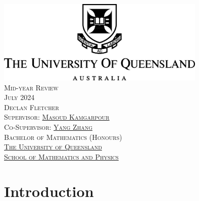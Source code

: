\documentclass[12pt]{amsart}
\theoremstyle{plain}
\begin{document}

\begin{center}
\includegraphics[width=10cm]{../images/UQLogo.jpg} \\ 
\vspace{3cm}
{\LARGE\textsc{Mid-year Review}} \\
{\textsc{July 2024}} \\
\vspace{0.5cm}
{\textsc{Declan Fletcher}} \\
\vspace{5cm}
{\textsc{Supervisor: \href{https://sites.google.com/site/masoudkomi/home}{Masoud Kamgarpour}}} \\
{\textsc{Co-Supervisor: \href{https://sites.google.com/site/yangzhang139/home}{Yang Zhang}}} \\
\vspace{3cm}
{\textsc{Bachelor of Mathematics (Honours)}} \\
\vspace{1cm}
{\textsc{\href{https://www.uq.edu.au/}{The University of Queensland}}} \\
{\textsc{\href{https://smp.uq.edu.au/}{School of Mathematics and Physics}}}
\end{center}


\newpage
\tableofcontents


\newpage
{}
\section{Introduction}
\end{document}
